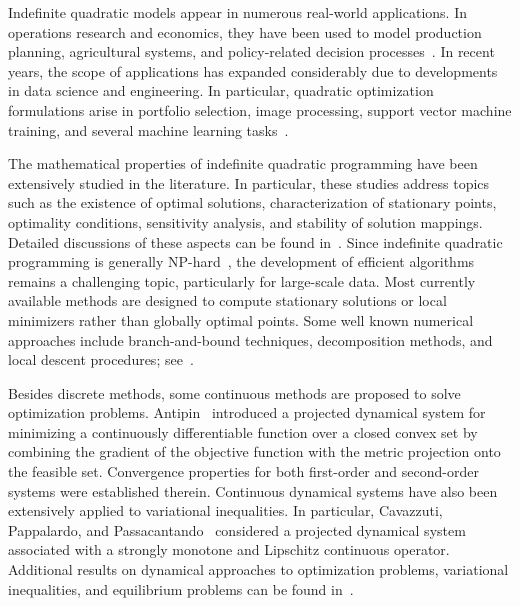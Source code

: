 \documentclass[11pt]{article}
\theoremstyle{definition}
\theoremstyle{remark}
\begin{document}
Indefinite quadratic models appear in numerous real-world applications. In operations research and economics, they have been used to model production planning, agricultural systems, and policy-related decision processes~\cite{Gupta_1995}. In recent years, the scope of applications has expanded considerably due to developments in data science and engineering. In particular, quadratic optimization formulations arise in portfolio selection, image processing, support vector machine training, and several machine learning tasks~\cite{Akoa_2008,Cornuejols_2018,Liu et al_2017a,McCarl et al_1977,Xu et al_2017,Xue et al_2019}.

The mathematical properties of indefinite quadratic programming have been extensively studied in the literature. In particular, these studies address topics such as the existence of optimal solutions, characterization of stationary points, optimality conditions, sensitivity analysis, and stability of solution mappings. Detailed discussions of these aspects can be found in~\cite{lty2012}. Since indefinite quadratic programming is generally NP-hard~\cite{Pardalos_Vavasis_1991}, the development of efficient algorithms remains a challenging topic, particularly for large-scale data. Most currently available methods are designed to compute stationary solutions or local minimizers rather than globally optimal points. Some well known numerical approaches include branch-and-bound techniques, decomposition methods, and local descent procedures; see~\cite{Bomze_Danninger_1994,Cambini_Sodini_2005,PhamDinh_LeThi_2,PhamDinh_LeThi98,PhamDinh_LeThi_3,PhamDinh_LeThi_Akoa,Ye89,Ye92,Ye97}. 

\medskip
Besides discrete methods, some continuous methods are proposed to solve optimization problems. Antipin~\cite{Antipin_94} introduced a projected dynamical system for minimizing a continuously differentiable function over a closed convex set by combining the gradient of the objective function with the metric projection onto the feasible set. Convergence properties for both first-order and second-order systems were established therein. Continuous dynamical systems have also been extensively applied to variational inequalities. In particular, Cavazzuti, Pappalardo, and Passacantando~\cite{CPP_02} considered a projected dynamical system associated with a strongly monotone and Lipschitz continuous operator. Additional results on dynamical approaches to optimization problems, variational inequalities, and equilibrium problems can be found in~\cite{AGR_00,APR_14,BCPP_19,DN_93,HSV_18,Hai_2022,NZ_96,PP_02,VTV_22,Vuong_2021,VS_20}. 
\end{document}
